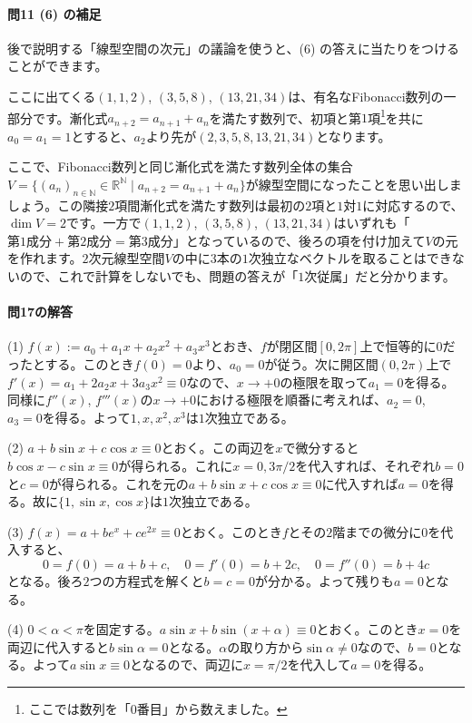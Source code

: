 \paragraph{問11 (6) の補足} 後で説明する「線型空間の次元」の議論を使うと、(6) の答えに当たりをつけることができます。

ここに出てくる$(1, 1, 2)$, $(3, 5, 8)$, $(13, 21, 34)$は、有名なFibonacci数列の一部分です。漸化式$a_{n + 2} = a_{n + 1} + a_n$を満たす数列で、初項と第$1$項\footnote{ここでは数列を「$0$番目」から数えました。}を共に$a_0 = a_1 = 1$とすると、$a_2$より先が$(2, 3, 5, 8, 13, 21, 34)$となります。

ここで、Fibonacci数列と同じ漸化式を満たす数列全体の集合$V = \{(a_n)_{n \in \mathbb{N}} \in \mathbb{R}^{\mathbb{N}} \mid a_{n + 2} = a_{n + 1} + a_n\}$が線型空間になったことを思い出しましょう。この隣接$2$項間漸化式を満たす数列は最初の$2$項と$1$対$1$に対応するので、$\dim V = 2$です。一方で$(1, 1, 2)$, $(3, 5, 8)$, $(13, 21, 34)$はいずれも「$\text{第$1$成分} + \text{第$2$成分} = \text{第$3$成分}$」となっているので、後ろの項を付け加えて$V$の元を作れます。$2$次元線型空間$V$の中に$3$本の$1$次独立なベクトルを取ることはできないので、これで計算をしないでも、問題の答えが「$1$次従属」だと分かります。

\paragraph{問17の解答}
(1) $f(x) := a_0 + a_1 x + a_2 x^2 + a_3 x^3$とおき、$f$が閉区間$[0, 2\pi]$上で恒等的に$0$だったとする。このとき$f(0) = 0$より、$a_0 = 0$が従う。次に開区間$(0, 2\pi)$上で$f'(x) = a_1 + 2a_2 x + 3a_3 x^2 \equiv 0$なので、$x\rightarrow +0$の極限を取って$a_1 = 0$を得る。同様に$f''(x)$, $f'''(x)$の$x\rightarrow +0$における極限を順番に考えれば、$a_2 = 0$, $a_3 = 0$を得る。よって$1, x, x^2, x^3$は$1$次独立である。

\noindent (2) $a + b\sin x + c \cos x \equiv 0$とおく。この両辺を$x$で微分すると$b\cos x - c\sin x \equiv 0$が得られる。これに$x = 0, 3\pi/2$を代入すれば、それぞれ$b = 0$と$c = 0$が得られる。これを元の$a + b\sin x + c \cos x \equiv 0$に代入すれば$a = 0$を得る。故に$\{1, \sin x, \cos x\}$は$1$次独立である。

\noindent (3) $f(x) = a + be^x + ce^{2x} \equiv 0$とおく。このとき$f$とその$2$階までの微分に$0$を代入すると、
\[
0 = f(0) = a + b + c,\quad 0 = f'(0) = b + 2c,\quad 0 = f''(0) = b + 4c
\]
となる。後ろ$2$つの方程式を解くと$b = c = 0$が分かる。よって残りも$a = 0$となる。

\noindent (4) $0 < \alpha < \pi$を固定する。$a \sin x + b \sin(x + \alpha) \equiv 0$とおく。このとき$x = 0$を両辺に代入すると$b\sin\alpha = 0$となる。$\alpha$の取り方から$\sin\alpha\neq 0$なので、$b = 0$となる。よって$a\sin x \equiv 0$となるので、両辺に$x = \pi/2$を代入して$a = 0$を得る。

